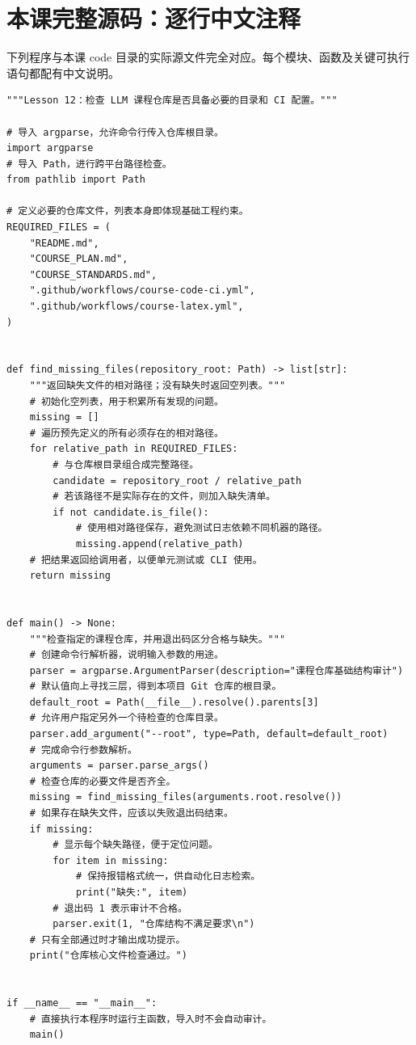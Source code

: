 \documentclass[UTF8,11pt,a4paper]{ctexart}
\begin{document}
\section{本课完整源码：逐行中文注释}
下列程序与本课 code 目录的实际源文件完全对应。每个模块、函数及关键可执行语句都配有中文说明。
\begin{Verbatim}[fontsize=\scriptsize,breaklines=true,breakanywhere=true]
"""Lesson 12：检查 LLM 课程仓库是否具备必要的目录和 CI 配置。"""

# 导入 argparse，允许命令行传入仓库根目录。
import argparse
# 导入 Path，进行跨平台路径检查。
from pathlib import Path

# 定义必要的仓库文件，列表本身即体现基础工程约束。
REQUIRED_FILES = (
    "README.md",
    "COURSE_PLAN.md",
    "COURSE_STANDARDS.md",
    ".github/workflows/course-code-ci.yml",
    ".github/workflows/course-latex.yml",
)


def find_missing_files(repository_root: Path) -> list[str]:
    """返回缺失文件的相对路径；没有缺失时返回空列表。"""
    # 初始化空列表，用于积累所有发现的问题。
    missing = []
    # 遍历预先定义的所有必须存在的相对路径。
    for relative_path in REQUIRED_FILES:
        # 与仓库根目录组合成完整路径。
        candidate = repository_root / relative_path
        # 若该路径不是实际存在的文件，则加入缺失清单。
        if not candidate.is_file():
            # 使用相对路径保存，避免测试日志依赖不同机器的路径。
            missing.append(relative_path)
    # 把结果返回给调用者，以便单元测试或 CLI 使用。
    return missing


def main() -> None:
    """检查指定的课程仓库，并用退出码区分合格与缺失。"""
    # 创建命令行解析器，说明输入参数的用途。
    parser = argparse.ArgumentParser(description="课程仓库基础结构审计")
    # 默认值向上寻找三层，得到本项目 Git 仓库的根目录。
    default_root = Path(__file__).resolve().parents[3]
    # 允许用户指定另外一个待检查的仓库目录。
    parser.add_argument("--root", type=Path, default=default_root)
    # 完成命令行参数解析。
    arguments = parser.parse_args()
    # 检查仓库的必要文件是否齐全。
    missing = find_missing_files(arguments.root.resolve())
    # 如果存在缺失文件，应该以失败退出码结束。
    if missing:
        # 显示每个缺失路径，便于定位问题。
        for item in missing:
            # 保持报错格式统一，供自动化日志检索。
            print("缺失:", item)
        # 退出码 1 表示审计不合格。
        parser.exit(1, "仓库结构不满足要求\n")
    # 只有全部通过时才输出成功提示。
    print("仓库核心文件检查通过。")


if __name__ == "__main__":
    # 直接执行本程序时运行主函数，导入时不会自动审计。
    main()
\end{Verbatim}
\end{document}
